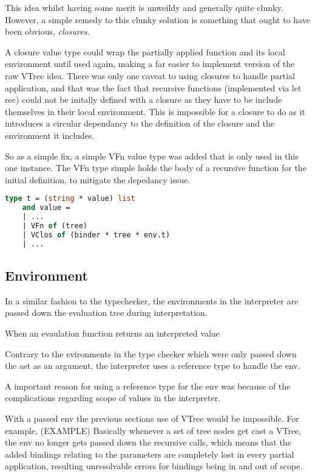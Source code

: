 \documentclass{l4proj}
\begin{document}
This idea whilst having some merit is unweildy and generally quite clunky.
However, a simple remedy to this clunky solution is something that ought to have been obvious, \emph{closures}.

A closure value type could wrap the partially applied function and its local environment until used again, making a far easier to implement version of the raw VTree idea.
There was only one caveat to using closures to handle partial application, and that was the fact that recursive functions (implemented via let rec) could not be initally defined with a closure as they have to be include themselves in their local environment.
This is impossible for a closure to do as it introduces a circular dependancy to the definition of the closure and the environment it includes.

So as a simple fix, a simple VFn value type was added that is only used in this one instance.
The VFn type simple holds the body of a recursive function for the initial definition, to mitigate the depedancy issue.

\begin{lstlisting}[language=Caml, caption=The aditional type definitions of a VClos and VFn.]
    type t = (string * value) list
    and value = 
    | ...
    | VFn of (tree)
    | VClos of (binder * tree * env.t)
    | ...
\end{lstlisting}

\subsection{Environment}

In a similar fashion to the typechecker, the environments in the interpreter are passed down the evaluation tree during interpretation.

When an evaulation function returns an interpreted value

Contrary to the evironments in the type checker which were only passed down the ast as an argument, the interpreter uses a reference type to handle the env.

A important reason for using a reference type for the env was because of the complications regarding scope of values in the interpreter.

With a passed env the previous sections use of VTree would be impossible.
For example, (EXAMPLE) Basically whenever a set of tree nodes get cast a VTree, the env no longer gets passed down the recursive calls, which means that the added bindings relating to the parameters are completely lost in every partial application, resulting unresolvable errors for bindings being in and out of scope.
\end{document}
